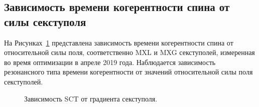 \subsection{Зависимость времени когерентности спина от силы секступоля}
На Рисунках~\ref{fig:SCT_scan} представлена зависимость времени когерентности спина от относительной силы поля, соответственно MXL и MXG секступолей, измеренная во время оптимизации в апреле 2019 года. Наблюдается зависимость резонансного типа времени когерентности от значений относительной силы поля секступолей.

\begin{figure}[H]\centering
\end{figure}
\begin{figure}[H]\centering
	\caption{Зависимость SCT от градиента секступоля.\label{fig:SCT_scan}}
\end{figure}

